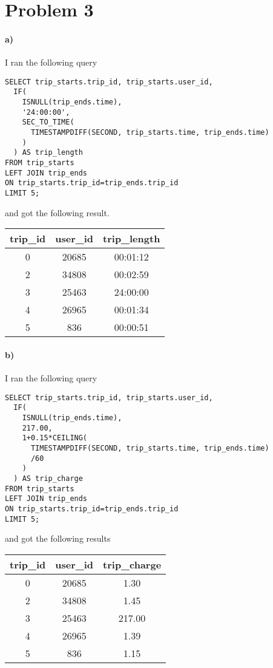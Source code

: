 \documentclass[12pt]{article}
\begin{document}
\section*{Problem 3}

\paragraph{a)}

I ran the following query
\begin{verbatim}
SELECT trip_starts.trip_id, trip_starts.user_id,
  IF(
    ISNULL(trip_ends.time),
    '24:00:00',
    SEC_TO_TIME(
      TIMESTAMPDIFF(SECOND, trip_starts.time, trip_ends.time)
    )
  ) AS trip_length
FROM trip_starts
LEFT JOIN trip_ends
ON trip_starts.trip_id=trip_ends.trip_id
LIMIT 5;
\end{verbatim}
and got the following result.
\begin{center}
        \begin{tabular}{c|c|c}
                trip\_id & user\_id & trip\_length\\
                \hline
                0 & 20685 & 00:01:12\\
                2 & 34808 & 00:02:59\\
                3 & 25463 & 24:00:00\\
                4 & 26965 & 00:01:34\\
                5 & 836 & 00:00:51
        \end{tabular}
\end{center}

\paragraph{b)}

I ran the following query
\begin{verbatim}
SELECT trip_starts.trip_id, trip_starts.user_id,
  IF(
    ISNULL(trip_ends.time),
    217.00,
    1+0.15*CEILING(
      TIMESTAMPDIFF(SECOND, trip_starts.time, trip_ends.time)
      /60
    )
  ) AS trip_charge
FROM trip_starts
LEFT JOIN trip_ends
ON trip_starts.trip_id=trip_ends.trip_id
LIMIT 5;
\end{verbatim}
and got the following results
\begin{center}
        \begin{tabular}{c|c|c}
                trip\_id & user\_id & trip\_charge\\
                \hline
                0 & 20685 & 1.30\\
                2 & 34808 & 1.45\\
                3 & 25463 & 217.00\\
                4 & 26965 & 1.39\\
                5 & 836 & 1.15
        \end{tabular}
\end{center}
\end{document}
